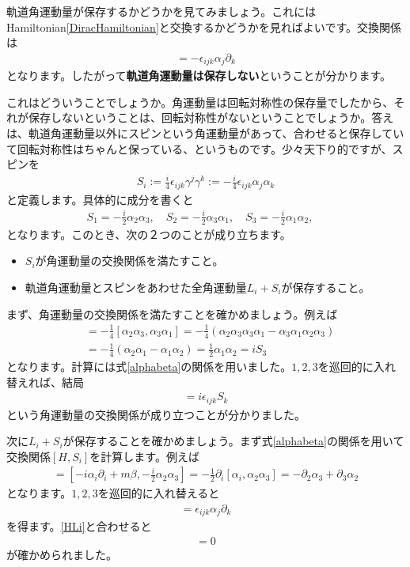\documentclass[report,paper=a4, fontsize=12pt, line_length=16cm, number_of_lines=33,dvipdfmx]{jlreq}
\numberwithin{equation}{chapter}
\newcommand{\del}{\partial}
\newcommand{\strong}[1]{{\sffamily \bfseries #1}}
\begin{document}
軌道角運動量が保存するかどうかを見てみましょう。これにはHamiltonian\eqref{DiracHamiltonian}と交換するかどうかを見ればよいです。交換関係は
\begin{align}
  [H,L_i]=-\epsilon_{ijk}\alpha_{j}\del_{k}\label{HLi}
\end{align}
となります。したがって\strong{軌道角運動量は保存しない}ということが分かります。

これはどういうことでしょうか。角運動量は回転対称性の保存量でしたから、それが保存しないということは、回転対称性がないということでしょうか。答えは、軌道角運動量以外にスピンという角運動量があって、合わせると保存していて回転対称性はちゃんと保っている、というものです。少々天下り的ですが、スピンを
\begin{align}
  S_i
  :=\frac{i}{4}\epsilon_{ijk}\gamma^{j}\gamma^{k}
  :=-\frac{i}{4}\epsilon_{ijk}\alpha_{j}\alpha_{k}\label{spin1/2}
\end{align}
と定義します。具体的に成分を書くと
\begin{align}
  S_1=-\frac{i}{2}\alpha_{2}\alpha_{3},\quad
  S_2=-\frac{i}{2}\alpha_{3}\alpha_{1},\quad
  S_3=-\frac{i}{2}\alpha_{1}\alpha_{2},\quad
\end{align}
となります。このとき、次の２つのことが成り立ちます。
\begin{itemize}
  \item $S_i$が角運動量の交換関係を満たすこと。
  \item 軌道角運動量とスピンをあわせた全角運動量$L_i+S_i$が保存すること。
\end{itemize}

まず、角運動量の交換関係を満たすことを確かめましょう。例えば
\begin{align}
  [S_1,S_2]&=-\frac{1}{4}[\alpha_{2}\alpha_{3},\alpha_{3}\alpha_{1}]
  =-\frac{1}{4}(\alpha_{2}\alpha_{3}\alpha_{3}\alpha_{1}-\alpha_{3}\alpha_{1}\alpha_{2}\alpha_{3})\nonumber\\
  &=-\frac{1}{4}(\alpha_{2}\alpha_{1}-\alpha_{1}\alpha_{2})
  =\frac{1}{2}\alpha_{1}\alpha_{2}
  =iS_3
\end{align}
となります。計算には式\eqref{alphabeta}の関係を用いました。$1,2,3$を巡回的に入れ替えれば、結局
\begin{align}
  [S_i,S_j]=i\epsilon_{ijk}S_k
\end{align}
という角運動量の交換関係が成り立つことが分かりました。

次に$L_i+S_i$が保存することを確かめましょう。まず式\eqref{alphabeta}の関係を用いて交換関係$[H,S_i]$を計算します。例えば
\begin{align}
  [H,S_1]
  =[-i\alpha_i\del_i+m\beta,-\frac{i}{2}\alpha_2\alpha_3]
  =-\frac12\del_{i}[\alpha_i,\alpha_2\alpha_3]
  =-\del_{2}\alpha_{3}+\del_{3}\alpha_{2}
\end{align}
となります。$1,2,3$を巡回的に入れ替えると
\begin{align}
  [H,S_i]=\epsilon_{ijk}\alpha_{j}\del_{k}
\end{align}
を得ます。\eqref{HLi}と合わせると
\begin{align}
  [H,L_i+S_i]=0
\end{align}
が確かめられました。
\end{document}
